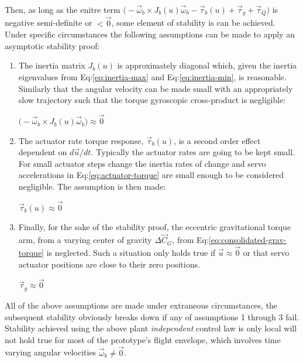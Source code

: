 Then, as long as the enitre term $\big(-\vec{\omega}_b\times J_b(u)\vec{\omega}_b-\vec{\tau}_b(u)+\vec{\tau}_g+\vec{\tau}_Q\big)$ is negative semi-definite or $<\vec{0}$, some element of stability is can be achieved. Under specific circumstances the following assumptions can be made to apply an asymptotic stability proof:
\vspace{-10pt}
\begin{enumerate}[itemsep=0em]
\item The inertia matrix $J_b(u)$ is approximately diagonal which, given the inertia eigenvalues from Eq:\ref{eq:inertia-max} and Eq:\ref{eq:inertia-min}, is reasonable. Similarly that the angular velocity can be made small with an appropriately slow trajectory such that the torque gyroscopic cross-product is negligible:
\begin{center}
\vspace{-10pt}
$\big(-\vec{\omega}_b\times J_b(u)\vec{\omega}_b\big)\approx\vec{0}$
\vspace{-8pt}
\end{center}
\item The actuator rate torque response, $\vec{\tau}_b(u)$, is a second order effect dependent on $d\vec{u}/dt$. Typically the actuator rates are going to be kept small. For small actuator steps change the inertia rates of change and servo accelerations in Eq:\ref{eq:actuator-torque} are small enough to be considered negligible. The assumption is then made:
\begin{center}
\vspace{-10pt}
$\vec{\tau}_b(u)\approx\vec{0}$
\vspace{-8pt}
\end{center}
\item Finally, for the sake of the stability proof, the eccentric gravitational torque arm, from a varying center of gravity $\Delta\vec{C}_G$, from Eq:\ref{eq:consolidated-grav-torque} is neglected. Such a situation only holds true if $\vec{u}\approx\vec{0}$ or that servo actuator positions are close to their zero positions.
\begin{center}
\vspace{-10pt}
$\vec{\tau}_g\approx\vec{0}$
\vspace{-8pt}
\end{center}
\end{enumerate}
All of the above assumptions are made under extraneous circumstances, the subsequent stability obviously breaks down if any of assumptions 1 through 3 fail. Stability achieved using the above plant \emph{independent} control law is only local will not hold true for most of the prototype's flight envelope, which involves time varying angular velocities $\vec{\omega}_b\not = \vec{0}$. 
